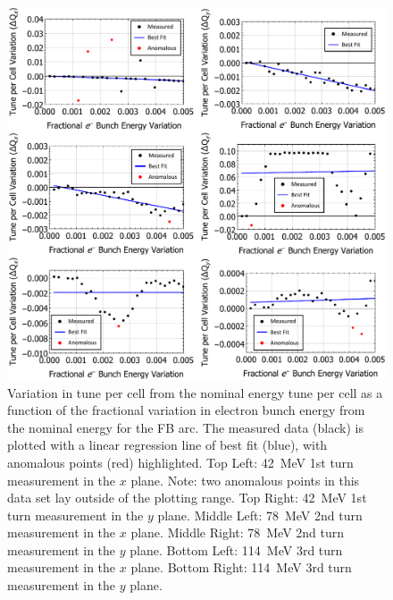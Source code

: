 \documentclass[../main.tex]{subfiles}
\begin{document}
\begin{figure}[!h]
\centering
\includegraphics[width=\textwidth]{Figures/CBETA_Multi-Pass_Commissioning/chromaticity/FB_analysed_3turn_dQdEe.pdf}
\caption{Variation in tune per cell from the nominal energy tune per cell as a function of the fractional variation in electron bunch energy from the nominal energy for the FB arc. The measured data (black) is plotted with a linear regression line of best fit (blue), with anomalous points (red) highlighted. Top Left: 42~\si{\mega\electronvolt} 1st turn measurement in the $x$ plane. Note: two anomalous points in this data set lay outside of the plotting range. Top Right: 42~\si{\mega\electronvolt} 1st turn measurement in the $y$ plane. Middle Left: 78~\si{\mega\electronvolt} 2nd turn measurement in the $x$ plane. Middle Right: 78~\si{\mega\electronvolt} 2nd turn measurement in the $y$ plane. Bottom Left: 114~\si{\mega\electronvolt} 3rd turn measurement in the $x$ plane. Bottom Right: 114~\si{\mega\electronvolt} 3rd turn measurement in the $y$ plane.}
\label{fig:FB_dQdEe}
\end{figure}
\end{document}
